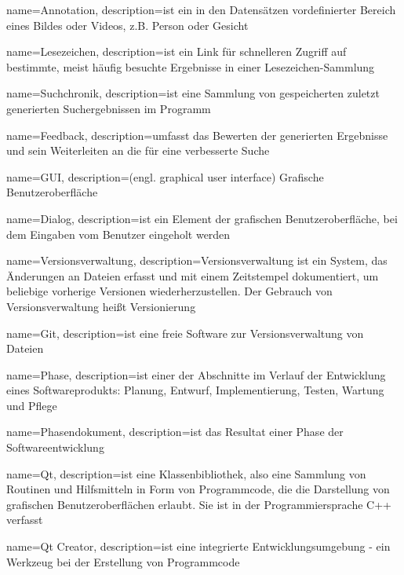 {
name=Annotation,
description={ist ein in den Datensätzen vordefinierter Bereich eines Bildes oder Videos, z.B. Person oder Gesicht}
}

{
name=Lesezeichen,
description={ist ein Link für schnelleren Zugriff auf bestimmte, meist häufig besuchte Ergebnisse in einer Lesezeichen-Sammlung}
}

{
name=Suchchronik,
description={ist eine Sammlung von gespeicherten zuletzt generierten Suchergebnissen im Programm}
}

{
name=Feedback,
description={umfasst das Bewerten der generierten Ergebnisse und sein Weiterleiten an die  für eine verbesserte Suche}
}

{
name=GUI,
description={(engl. graphical user interface) Grafische Benutzeroberfläche}
}

{
name=Dialog,
description={ist ein Element der grafischen Benutzeroberfläche, bei dem Eingaben vom Benutzer eingeholt werden}
}

{
name=Versionsverwaltung,
description={Versionsverwaltung ist ein System, das Änderungen an Dateien erfasst und mit einem Zeitstempel dokumentiert, um beliebige vorherige Versionen wiederherzustellen. Der Gebrauch von Versionsverwaltung heißt Versionierung}
}

{
name=Git,
description={ist eine freie Software zur \gls{Versionsverwaltung} von Dateien}
}

{
name=Phase,
description={ist einer der Abschnitte im Verlauf der Entwicklung eines Softwareprodukts: Planung, Entwurf, Implementierung, Testen, Wartung und Pflege}
}

{
name=Phasendokument,
description={ist das Resultat einer \gls{Phase} der Softwareentwicklung}
}

{
name=Qt,
description={ist eine Klassenbibliothek, also eine Sammlung von Routinen und Hilfsmitteln in Form von Programmcode, die die Darstellung von grafischen Benutzeroberflächen erlaubt. Sie ist in der Programmiersprache C++ verfasst}
}

{
name=Qt Creator,
description={ist eine integrierte Entwicklungsumgebung - ein Werkzeug bei der Erstellung von Programmcode}
}

